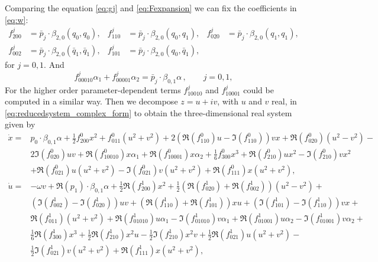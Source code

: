 \begin{subappendices}
Comparing the equation \cref{eq:gj} and \cref{eq:Fexpansion} we can fix the coefficients in \cref{eq:w}:
\begin{align*}
    f^j_{200} &{}= \bar{p}_j \cdot \beta_{2,0}(q_0, q_0),
        &f^j_{110} &{}= \bar{p}_j \cdot \beta_{2,0}(q_0, q_1),
        &f^j_{020} &{}= \bar{p}_j \cdot \beta_{2,0}(q_1, q_1), \\
    f^j_{002} &{}= \bar{p}_j \cdot \beta_{2,0}(\bar q_1, \bar q_1),
        &f^j_{101} &{}= \bar{p}\textbf{}_j \cdot \beta_{2,0}(q_0, \bar q_1),
\end{align*}
for $j=0,1$. And
\begin{equation}
    f^j_{00010} \alpha_1 + f^j_{00001} \alpha_2 = \bar{p}_j \cdot \beta_{0,1} \alpha\,, \qquad j=0,1,
\end{equation}
For the higher order parameter-dependent terms $f^j_{10010}$ and $f^j_{10001}$ could be computed in a similar way.
Then we decompose $z = u + iv$, with $u$ and $v$ real, in \cref{eq:reducedsystem_complex_form} to obtain the three-dimensional real system given by
\begin{equation} \label{eq:reducedsystem}
\begin{aligned}
    \dot x ={}& p_0 \cdot \beta_{0,1}\alpha + \frac12 f^0_{200} x^2 + f^0_{011} (u^2+v^2) + 2 (\Re(f^0_{110}) u - \Im(f^0_{110})) v x + \Re(f^0_{020}) (u^2-v^2) - \\
                    & 2\Im(f^0_{020}) u v + \Re(f^0_{10010}) x \alpha_1 + \Re(f^0_{10001}) x \alpha_2 + \frac16 f^0_{300} x^3 + \Re(f^0_{210}) u x^2 - \Im(f^0_{210}) v x^2 \\ 
                    & + \Re(f^0_{021}) u (u^2+v^2) - \Im(f^0_{021}) v (u^2+v^2) + \Re(f^0_{111}) x (u^2+v^2), \\
    \dot u ={}&  -\omega v + \Re (p_1) \cdot \beta_{0,1}\alpha + \frac12 \Re(f^1_{200}) x^2 + \frac12 (\Re(f^1_{020}) +  \Re(f^1_{002})) (u^2-v^2) + \\
                    & (\Im(f^1_{002}) -  \Im(f^1_{020})) u v + (\Re(f^1_{110}) +  \Re(f^1_{101})) x u + (\Im(f^1_{101}) - \Im(f^1_{110})) v x + \\
                    & \Re(f^1_{011}) (u^2+v^2) + \Re(f^1_{01010}) u \alpha_1 - \Im(f^1_{01010}) v \alpha_1 + \Re(f^1_{01001}) u \alpha_2 - \Im(f^1_{01001}) v \alpha_2 + \\
                    & \frac16 \Re(f^1_{300}) x^3 + \frac12 \Re(f^1_{210}) x^2 u - \frac12 \Im(f^1_{210}) x^2 v + \frac12 \Re(f^1_{021}) u (u^2+v^2) - \\
                    & \frac12 \Im(f^1_{021}) v (u^2+v^2) + \Re(f^1_{111}) x (u^2+v^2), \\

\end{aligned}
\end{equation}
\end{subappendices}
